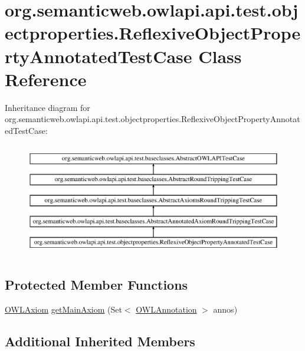 \hypertarget{classorg_1_1semanticweb_1_1owlapi_1_1api_1_1test_1_1objectproperties_1_1_reflexive_object_property_annotated_test_case}{\section{org.\-semanticweb.\-owlapi.\-api.\-test.\-objectproperties.\-Reflexive\-Object\-Property\-Annotated\-Test\-Case Class Reference}
\label{classorg_1_1semanticweb_1_1owlapi_1_1api_1_1test_1_1objectproperties_1_1_reflexive_object_property_annotated_test_case}
}
Inheritance diagram for org.\-semanticweb.\-owlapi.\-api.\-test.\-objectproperties.\-Reflexive\-Object\-Property\-Annotated\-Test\-Case\-:\begin{figure}[H]
\begin{center}
\leavevmode
\includegraphics[height=5.000000cm]{classorg_1_1semanticweb_1_1owlapi_1_1api_1_1test_1_1objectproperties_1_1_reflexive_object_property_annotated_test_case}
\end{center}
\end{figure}
\subsection*{Protected Member Functions}
\begin{DoxyCompactItemize}
\item 
\hyperlink{interfaceorg_1_1semanticweb_1_1owlapi_1_1model_1_1_o_w_l_axiom}{O\-W\-L\-Axiom} \hyperlink{classorg_1_1semanticweb_1_1owlapi_1_1api_1_1test_1_1objectproperties_1_1_reflexive_object_property_annotated_test_case_ad99ac6ad9917c2d5ebed53fe6cfc8adc}{get\-Main\-Axiom} (Set$<$ \hyperlink{interfaceorg_1_1semanticweb_1_1owlapi_1_1model_1_1_o_w_l_annotation}{O\-W\-L\-Annotation} $>$ annos)
\end{DoxyCompactItemize}
\subsection*{Additional Inherited Members}



